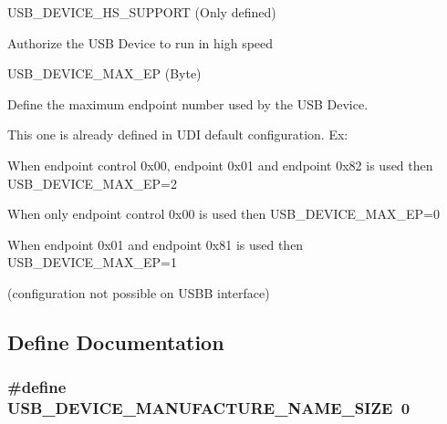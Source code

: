 \-U\-S\-B\-\_\-\-D\-E\-V\-I\-C\-E\-\_\-\-H\-S\-\_\-\-S\-U\-P\-P\-O\-R\-T (\-Only defined)\par
 \-Authorize the \-U\-S\-B \-Device to run in high speed

\-U\-S\-B\-\_\-\-D\-E\-V\-I\-C\-E\-\_\-\-M\-A\-X\-\_\-\-E\-P (\-Byte)\par
 \-Define the maximum endpoint number used by the \-U\-S\-B \-Device.\par
 \-This one is already defined in \-U\-D\-I default configuration. \-Ex\-:
\begin{DoxyItemize}
\item \-When endpoint control 0x00, endpoint 0x01 and endpoint 0x82 is used then \-U\-S\-B\-\_\-\-D\-E\-V\-I\-C\-E\-\_\-\-M\-A\-X\-\_\-\-E\-P=2
\item \-When only endpoint control 0x00 is used then \-U\-S\-B\-\_\-\-D\-E\-V\-I\-C\-E\-\_\-\-M\-A\-X\-\_\-\-E\-P=0
\item \-When endpoint 0x01 and endpoint 0x81 is used then \-U\-S\-B\-\_\-\-D\-E\-V\-I\-C\-E\-\_\-\-M\-A\-X\-\_\-\-E\-P=1\par
 (configuration not possible on \-U\-S\-B\-B interface) 
\end{DoxyItemize}

\subsection{\-Define \-Documentation}
\hypertarget{group__udc__group_gac2dafd8d9efe73f2709291818829a79b}{
\subsubsection[{\-U\-S\-B\-\_\-\-D\-E\-V\-I\-C\-E\-\_\-\-M\-A\-N\-U\-F\-A\-C\-T\-U\-R\-E\-\_\-\-N\-A\-M\-E\-\_\-\-S\-I\-Z\-E}]{\setlength{\rightskip}{0pt plus 5cm}\#define \-U\-S\-B\-\_\-\-D\-E\-V\-I\-C\-E\-\_\-\-M\-A\-N\-U\-F\-A\-C\-T\-U\-R\-E\-\_\-\-N\-A\-M\-E\-\_\-\-S\-I\-Z\-E~0}}
\label{group__udc__group_gac2dafd8d9efe73f2709291818829a79b}


